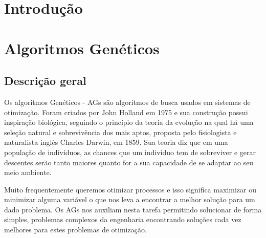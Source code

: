 \documentclass[
    12pt,               %
    oneside,%
    a4paper,            %
    english,            %
    french,             %
    spanish,            %
    brazil,             %
    ]{abntex2}
\begin{document}
\tableofcontents*
\cleardoublepage


\textual

\chapter*[Introdução]{Introdução}



\chapter{Algoritmos Genéticos}

\section{Descrição geral}

  Os algoritmos Genéticos  - AGs  são algoritmos de busca usados em sistemas de otimização. Foram criados por John Holland em 1975  e sua construção possui inspiração biológica, seguindo o princípio da teoria da evolução na qual há uma seleção natural e sobrevivência dos mais aptos, proposta pelo fisiologista e naturalista inglês Charles Darwin, em 1859. Sua teoria diz que em uma população de indivíduos, as chances que um indivíduo tem de sobreviver e gerar descentes serão tanto maiores quanto for a sua capacidade de se adaptar ao seu meio ambiente.

  Muito frequentemente queremos otimizar processos e isso significa maximizar ou minimizar alguma variável o que nos leva a encontrar a melhor solução para um dado problema.  Os AGs nos auxiliam nesta tarefa permitindo solucionar de forma simples, problemas complexos da engenharia encontrando soluções cada vez melhores para estes problemas de otimização.
\end{document}
